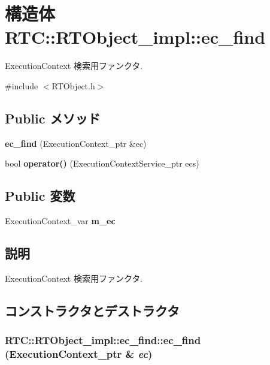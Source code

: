 \section{構造体 RTC::RTObject\_\-impl::ec\_\-find}
\label{structRTC_1_1RTObject__impl_1_1ec__find}


ExecutionContext 検索用ファンクタ.  




{\ttfamily \#include $<$RTObject.h$>$}

\subsection*{Public メソッド}
\begin{DoxyCompactItemize}
\item 
{\bf ec\_\-find} (ExecutionContext\_\-ptr \&ec)
\item 
bool {\bf operator()} (ExecutionContextService\_\-ptr ecs)
\end{DoxyCompactItemize}
\subsection*{Public 変数}
\begin{DoxyCompactItemize}
\item 
ExecutionContext\_\-var {\bf m\_\-ec}
\end{DoxyCompactItemize}


\subsection{説明}
ExecutionContext 検索用ファンクタ. 

\subsection{コンストラクタとデストラクタ}
\subsubsection[{ec\_\-find}]{\setlength{\rightskip}{0pt plus 5cm}RTC::RTObject\_\-impl::ec\_\-find::ec\_\-find (ExecutionContext\_\-ptr \& {\em ec})\hspace{0.3cm}{\ttfamily  [inline]}}\label{structRTC_1_1RTObject__impl_1_1ec__find_aa9d1625e73ea0bd77da0d6a7070ff96b}


